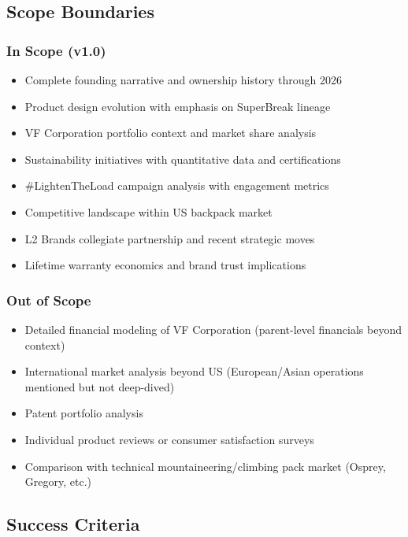 \documentclass[11pt,letterpaper]{article}
\begin{document}
\subsection{Scope Boundaries}

\subsubsection{In Scope (v1.0)}
\begin{itemize}[nosep]
  \item Complete founding narrative and ownership history through 2026
  \item Product design evolution with emphasis on SuperBreak lineage
  \item VF Corporation portfolio context and market share analysis
  \item Sustainability initiatives with quantitative data and certifications
  \item \#LightenTheLoad campaign analysis with engagement metrics
  \item Competitive landscape within US backpack market
  \item L2 Brands collegiate partnership and recent strategic moves
  \item Lifetime warranty economics and brand trust implications
\end{itemize}

\subsubsection{Out of Scope}
\begin{itemize}[nosep]
  \item Detailed financial modeling of VF Corporation (parent-level financials beyond context)
  \item International market analysis beyond US (European/Asian operations mentioned but not deep-dived)
  \item Patent portfolio analysis
  \item Individual product reviews or consumer satisfaction surveys
  \item Comparison with technical mountaineering/climbing pack market (Osprey, Gregory, etc.)
\end{itemize}

\subsection{Success Criteria}
\end{document}
